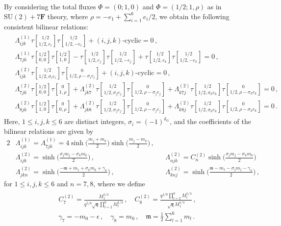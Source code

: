 \documentclass[11pt, a4paper]{article}
\newcommand{\tauftn}[2]{\tau\genfrac[]{0pt}{1}{#1}{#2}}
\theoremstyle{definition}
\begin{document}
By considering the total fluxes $ \Phi = (0; 1,0) $ and $ \Phi = (1/2; 1,\rho) $ as in $ \mathrm{SU}(2)+7\mathbf{F} $ theory, where $ \rho = -e_1 + \sum_{i=1}^6 e_i/2 $, we obtain the following consistent bilinear relations:
\begin{align}
    \begin{aligned}\label{eq:6F-bilinear1}
        & \Lambda_{ijk}^{(1)} \tauftn{1/2}{1/2,e_i} \tauftn{1/2}{1/2,-e_i} + (i,j,k)\text{-cyclic} = 0 \, , \\
        & \Lambda_{7jk}^{(1)} \tauftn{1/2}{0,0} \tauftn{1/2}{1,0} - \tauftn{1/2}{1/2,e_j} \tauftn{1/2}{1/2,-e_j} + \tauftn{1/2}{1/2,e_k} \tauftn{1/2}{1/2,-e_k} = 0 \, , \\
        &\Lambda_{ijk}^{(2)} \tauftn{1/2}{1/2, \sigma_i e_i} \tauftn{0}{1/2, \rho- \sigma_i e_i} + (i,j,k)\text{-cyclic} = 0 \, , \\
        &\Lambda_{7jk}^{(2)} \tauftn{1/2}{0,0} \tauftn{0}{1,\rho} + \Lambda_{jk7}^{(2)} \tauftn{1/2}{1/2, \sigma_j e_j} \tauftn{0}{1/2,\rho- \sigma_j e_j} + \Lambda_{k7j}^{(2)} \tauftn{1/2}{1/2, \sigma_k e_k} \tauftn{0}{1/2,\rho- \sigma_k e_k} = 0 \, , \\
        &\Lambda_{8jk}^{(2)} \tauftn{1/2}{1,0} \tauftn{0}{0,\rho} + \Lambda_{jk8}^{(2)} \tauftn{1/2}{1/2, \sigma_j e_j} \tauftn{0}{1/2,\rho- \sigma_j e_j} + \Lambda_{k8j}^{(2)} \tauftn{1/2}{1/2, \sigma_k e_k} \tauftn{0}{1/2,\rho- \sigma_k e_k} = 0 \, .
    \end{aligned}
\end{align}
Here, $ 1 \leq i, j, k \leq 6 $ are distinct integers, $ \sigma_i= (-1)^{\delta_{i1}} $, and the coefficients of the bilinear relations are given by
\begin{alignat}{2}
    &\Lambda_{ijk}^{(1)} = \Lambda_{7jk}^{(1)} = 4\sinh\Big(\frac{m_j + m_k}{2}\Big) \sinh\Big(\frac{m_j - m_k}{2}\Big) \, , \\
    &\Lambda_{ijk}^{(2)} = \sinh\Big(\frac{\sigma_j m_j - \sigma_k m_k}{2}\Big) \, ,
    &&\Lambda_{njk}^{(2)} = C_n^{(2)} \sinh\Big(\frac{\sigma_j m_j - \sigma_k m_k}{2}\Big) \nonumber \\
    &\Lambda_{jkn}^{(2)} = \sinh\Big(\frac{-\mathfrak{m} + m_1 + \sigma_k m_k + \gamma_n}{2}\Big) \, ,
    &&\Lambda_{knj}^{(2)} = \sinh\Big(\frac{\mathfrak{m} - m_1 - \sigma_j m_j - \gamma_n}{2}\Big) \, , \nonumber
\end{alignat}
for $ 1 \leq i,j,k \leq 6 $ and $ n=7,8 $, where we define
\begin{gather}
    \begin{gathered}\label{eq:6F-tildem}
        C_7^{(2)} = \frac{M_1^{1/4}}{q^{5/8} \sqrt{\mathfrak{q}} \prod_{l=2}^6 M_l^{1/4}} \, , \quad
        C_8^{(2)} = \frac{q^{1/8} \prod_{l=2}^6 M_l^{1/4}}{\sqrt{\mathfrak{q}} M_1^{1/4}} \, , \\
        \gamma_7 = -m_0-\epsilon \, , \quad
        \gamma_8 = m_0 \, , \quad
        \mathfrak{m} = \frac{1}{2}\sum_{l=1}^6 m_l \, .
    \end{gathered}
\end{gather}
\end{document}
